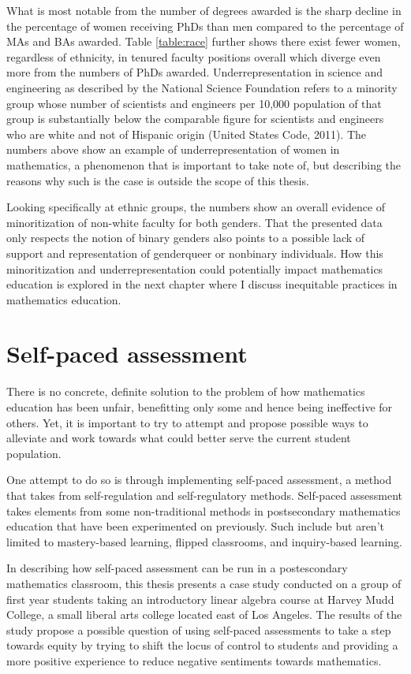 What is most notable from the number of degrees awarded is the sharp decline in the percentage of women receiving PhDs than men compared to the percentage of MAs and BAs awarded. Table \ref{table:race} further shows there exist fewer women, regardless of ethnicity, in tenured faculty positions overall which diverge even more from the numbers of PhDs awarded. Underrepresentation in science and engineering as described by the National Science Foundation refers to a minority group whose number of scientists and engineers per 10,000 population of that group is substantially below the comparable figure for scientists and engineers who are white and not of Hispanic origin (United States Code, 2011). The numbers above show an example of underrepresentation of women in mathematics, a phenomenon that is important to take note of, but describing the reasons why such is the case is outside the scope of this thesis.

Looking specifically at ethnic groups, the numbers show an overall evidence of minoritization of non-white faculty for both genders. That the presented data only respects the notion of binary genders also points to a possible lack of support and representation of genderqueer or nonbinary individuals. How this minoritization and underrepresentation could potentially impact mathematics education is explored in the next chapter where I discuss inequitable practices in mathematics education.

\section{Self-paced assessment}

There is no concrete, definite solution to the problem of how mathematics education has been unfair, benefitting only some and hence being ineffective for others. Yet, it is important to try to attempt and propose possible ways to alleviate and work towards what could better serve the current student population.

One attempt to do so is through implementing self-paced assessment, a method that takes from self-regulation and self-regulatory methods. Self-paced assessment takes elements from some non-traditional methods in postsecondary mathematics education that have been experimented on previously. Such include but aren't limited to mastery-based learning, flipped classrooms, and inquiry-based learning.

In describing how self-paced assessment can be run in a postescondary mathematics classroom, this thesis presents a case study conducted on a group of first year students taking an introductory linear algebra course at Harvey Mudd College, a small liberal arts college located east of Los Angeles. The results of the study propose a possible question of using self-paced assessments to take a step towards equity by trying to shift the locus of control to students and providing a more positive experience to reduce negative sentiments towards mathematics.
